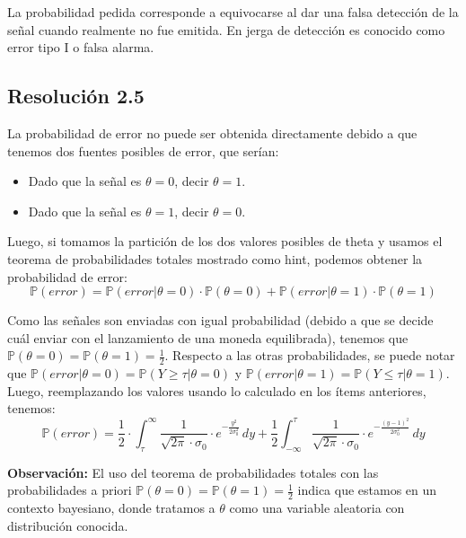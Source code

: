 \documentclass[
  11pt,
  letterpaper,
   addpoints,
  answers
  ]{exam}
\begin{document}
\begin{questions}
\begin{solution}
  La probabilidad pedida corresponde a equivocarse al dar una falsa detección de la señal cuando realmente no fue emitida. En jerga de detección es conocido como error tipo I o falsa alarma.

  \subsection*{Resolución 2.5}
  
  La probabilidad de error no puede ser obtenida directamente debido a que tenemos dos fuentes posibles de error, que serían:
  \begin{itemize}
  \item Dado que la señal es $\theta = 0$, decir $\theta = 1$.
  \item Dado que la señal es $\theta = 1$, decir $\theta = 0$.
  \end{itemize}
  
  Luego, si tomamos la partición de los dos valores posibles de theta y usamos el teorema de probabilidades totales mostrado como hint, podemos obtener la probabilidad de error:
  \begin{equation}
  \mathbb{P}(error) = \mathbb{P}(error|\theta = 0) \cdot \mathbb{P}(\theta = 0) + \mathbb{P}(error|\theta = 1) \cdot \mathbb{P}(\theta = 1)
  \end{equation}
  
  Como las señales son enviadas con igual probabilidad (debido a que se decide cuál enviar con el lanzamiento de una moneda equilibrada), tenemos que $\mathbb{P}(\theta = 0) = \mathbb{P}(\theta = 1) = \frac{1}{2}$. Respecto a las otras probabilidades, se puede notar que $\mathbb{P}(error|\theta = 0) = \mathbb{P}(Y \geq \tau | \theta = 0)$ y $\mathbb{P}(error|\theta = 1) = \mathbb{P}(Y \leq \tau | \theta = 1)$. Luego, reemplazando los valores usando lo calculado en los ítems anteriores, tenemos:
  \begin{equation}
  \mathbb{P}(error) = \frac{1}{2} \cdot \int_{\tau}^{\infty} \frac{1}{\sqrt{2\pi} \cdot \sigma_0} \cdot e^{-\frac{y^2}{2\sigma_0^2}} \, dy + \frac{1}{2} \int_{-\infty}^{\tau} \frac{1}{\sqrt{2\pi} \cdot \sigma_0} \cdot e^{-\frac{(y-1)^2}{2\sigma_0^2}} \, dy
  \end{equation}
  
  \textbf{Observación:} El uso del teorema de probabilidades totales con las probabilidades a priori $\mathbb{P}(\theta = 0) = \mathbb{P}(\theta = 1) = \frac{1}{2}$ indica que estamos en un contexto bayesiano, donde tratamos a $\theta$ como una variable aleatoria con distribución conocida.


\end{solution}
\end{questions}
\end{document}

